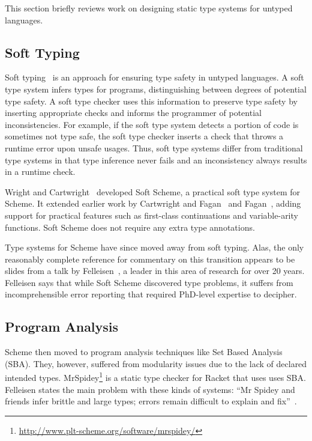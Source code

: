 This section briefly reviews work on designing static type systems for untyped languages.

\subsection{Soft Typing}

Soft typing~\cite{CF91}
is an approach for ensuring type safety in untyped languages.
A soft type system infers types for programs, distinguishing between degrees
of potential type safety.
A soft type checker uses this information to 
preserve type safety by inserting appropriate checks 
and informs the programmer of potential inconsistencies.
For example, if the soft type system detects a portion of code is sometimes not type safe,
the soft type checker inserts a check that throws a runtime error upon unsafe usages.
Thus, soft type systems differ from traditional type systems in that type inference 
never fails and an inconsistency always results in a runtime check.

Wright and Cartwright~\cite{WC97} developed Soft Scheme, a practical
soft type system for Scheme. 
It extended earlier work by Cartwright and Fagan~\cite{CF91}
and Fagan~\cite{Fag91}, adding support for practical features such as
first-class continuations and variable-arity functions.
Soft Scheme does not require any extra type annotations.

Type systems for Scheme have since moved away from soft typing.
Alas, the only reasonably complete reference for commentary on this transition 
appears to be slides from a talk by Felleisen~\cite{Fell09},
a leader in this area of research for over 20 years.
Felleisen says that while Soft Scheme discovered type problems, 
it suffers from incomprehensible
error reporting that required PhD-level expertise to decipher. 

\subsection{Program Analysis}

Scheme then moved to program analysis techniques like Set Based Analysis (SBA).
They, however, suffered from modularity issues due to the lack of declared intended types.
MrSpidey\footnote{\url{http://www.plt-scheme.org/software/mrspidey/}}
is a static type checker for Racket that uses uses SBA.
Felleisen states the main problem with these kinds of systems: ``Mr Spidey and friends infer brittle and large
types; errors remain difficult to explain and fix''~\cite{Fell09}.

